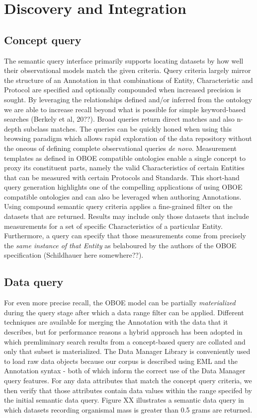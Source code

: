 
\section{Discovery and Integration}

\subsection{Concept query}
The semantic query interface primarily supports locating datasets by how well their observational models match the given criteria. Query criteria largely mirror the structure of an Annotation in that combinations of Entity, Characteristic and Protocol are specified and optionally compounded when increased precision is sought. 
By leveraging the relationships defined and/or inferred from the ontology we are able to increase recall beyond what is possible for simple keyword-based searches (Berkely et al, 20??). Broad queries return direct matches and also n-depth subclass matches. The queries can be quickly honed when using this browsing paradigm which allows rapid exploration of the data repository without the oneous of defining complete observational queries \emph{de novo}. Measurement templates as defined in OBOE compatible ontologies enable a single concept to proxy its constituent parts, namely the valid Characteristics of certain Entities that can be measured with certain Protocols and Standards. This short-hand query generation highlights one of the compelling applications of using OBOE compatible ontologies and can also be leveraged when authoring Annotations.
Using compound semantic query criteria applies a fine-grained filter on the datasets that are returned. Results may include only those datasets that include measurements for a set of specific Characteristics of a particular Entity. Furthermore, a query can specify that those measurements come from precisely the \emph{same instance of that Entity} as belaboured by the authors of the OBOE specification (Schildhauer here somewhere??).

\subsection{Data query}
For even more precise recall, the OBOE model can be partially \emph{materialized} during the query stage after which a data range filter can be applied. Different techniques are available for merging the Annotation with the data that it describes, but for performance reasons a hybrid approach has been adopted in which premliminary search results from a concept-based query are collated and only that subset is materialized. The Data Manager Library is conveniently used to load raw data objects because our corpus is described using EML and the Annotation syntax - both of which inform the correct use of the Data Manager query features. For any data attributes that match the concept query criteria, we then verify that those attributes contain data values within the range specifed by the initial semantic data query. Figure XX illustrates a semantic data query in which datasets recording organismal mass is greater than 0.5 grams are returned.


